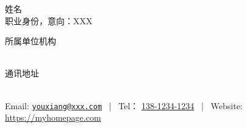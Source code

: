 \documentclass[UTF8, 11pt, a4paper]{ctexart}
\makeatletter
\newcommand{\MyName}{姓名}
\newcommand{\MyRole}{职业身份，意向：XXX}
\newcommand{\Affiliation}{
    所属单位机构
}
\newcommand{\Address}{
    通讯地址
}
\newcommand{\Phone}{138-1234-1234}
\newcommand{\Email}{youxiang@xxx.com}
\newcommand{\Website}{https://myhomepage.com}
\makeatother
\begin{document}
\begin{center}
    {\fontsize{36pt}{0}\selectfont \MyName}
    \\[0.5cm]
    {\fontsize{16pt}{0}\selectfont \MyRole}
    \\[0.3cm]
    {\fontsize{10pt}{0}\selectfont
        \Affiliation
        \\[0.2cm]
        \Address
        \\[0.08cm]
        Email: \href{mailto:\Email}{\texttt{\Email}}
        \, | \,
        Tel： \url{\Phone}
        \, | \,
        Website: \url{\Website}
    }
\end{center}

\end{document}
